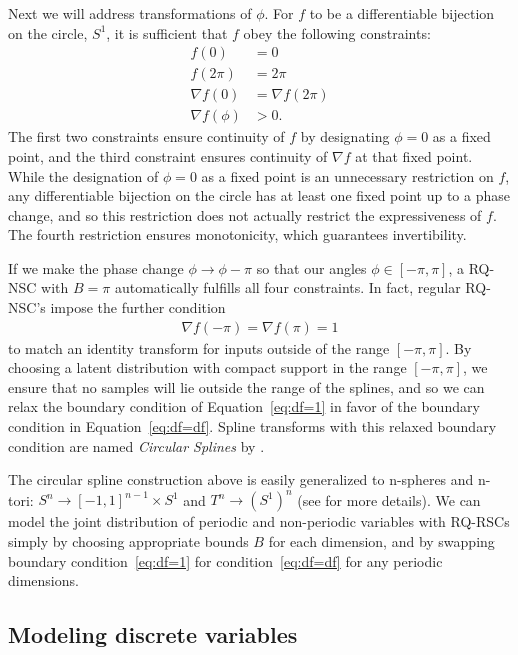 \documentclass[twocolumn,twocolappendix]{aastex631}
\begin{document}
Next we will address transformations of $\phi$.
For $f$ to be a differentiable bijection on the circle, $S^1$, it is sufficient that $f$ obey the following constraints:
\begin{align}
    f(0) &= 0 \\
    f(2\pi) &= 2\pi \\
    \nabla f(0) &= \nabla f(2\pi) \label{eq:df=df} \\
    \nabla f(\phi) &> 0.
\end{align}
The first two constraints ensure continuity of $f$ by designating $\phi=0$ as a fixed point, and the third constraint ensures continuity of $\nabla f$ at that fixed point.
While the designation of $\phi=0$ as a fixed point is an unnecessary restriction on $f$, any differentiable bijection on the circle has at least one fixed point up to a phase change, and so this restriction does not actually restrict the expressiveness of $f$.
The fourth restriction ensures monotonicity, which guarantees invertibility.

If we make the phase change $\phi \to \phi - \pi$ so that our angles $\phi \in [-\pi, \pi]$, a RQ-NSC with $B=\pi$ automatically fulfills all four constraints.
In fact, regular RQ-NSC's impose the further condition
\begin{align}
    \nabla f(-\pi) = \nabla f(\pi) = 1 \label{eq:df=1}
\end{align}
to match an identity transform for inputs outside of the range $[-\pi, \pi]$.
By choosing a latent distribution with compact support in the range $[-\pi, \pi]$, we ensure that no samples will lie outside the range of the splines, and so we can relax the boundary condition of Equation~\ref{eq:df=1} in favor of the boundary condition in Equation~\ref{eq:df=df}.
Spline transforms with this relaxed boundary condition are named \emph{Circular Splines} by \citet{rezende2020}.

The circular spline construction above is easily generalized to n-spheres and n-tori: $S^n \to [-1, 1]^{n-1} \times S^1$ and $T^n \to (S^1)^n$ (see \citealt{rezende2020} for more details).
We can model the joint distribution of periodic and non-periodic variables with RQ-RSCs simply by choosing appropriate bounds $B$ for each dimension, and by swapping boundary condition~\ref{eq:df=1} for condition~\ref{eq:df=df} for any periodic dimensions.


\subsection{Modeling discrete variables}
\label{sec:discrete}
\end{document}
